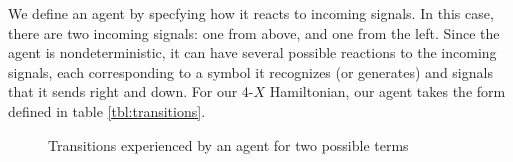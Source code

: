 \documentclass{amsbook}
\theoremstyle{plain}
\theoremstyle{definition}
\theoremstyle{remark}
\begin{document}
We define an agent by specfying how it reacts to incoming signals.  In this case, there are two incoming signals:  one from above, and one from the left.  Since the agent is nondeterministic, it can have several possible reactions to the incoming signals, each corresponding to a symbol it recognizes (or generates) and signals that it sends right and down.  For our 4-$X$ Hamiltonian, our agent takes the form defined in table \ref{tbl:transitions}.

\begin{figure}
\caption{Transitions experienced by an agent for two possible terms}
\end{figure}
\end{document}
